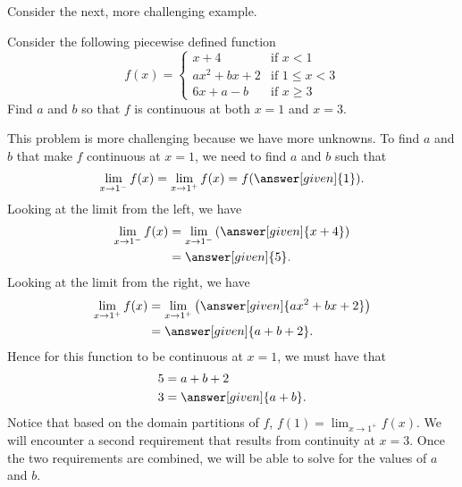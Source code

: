 \documentclass{ximera}
\begin{document}
Consider the next, more challenging example.

\begin{example}
Consider the following piecewise defined function
\[
f(x) = 
\begin{cases}
  x+4 &\text{if $x<1$}\\
  ax^2+bx+2 &\text{if $1\le x< 3$}\\
  6x+a-b &\text{if $x\ge 3$}
\end{cases}
\]
Find $a$ and $b$ so that $f$ is continuous at both $x=1$ and $x=3$.
\begin{explanation}
This problem is more challenging because we have more
unknowns. To find $a$ and
$b$ that make $f$ continuous at $x=1$, we need to find $a$ and $b$
such that
\[
\lim_{x\to 1^-} f(x) = \lim_{x\to 1^+}f(x)=f(\answer[given]{1}).
\]
Looking at the limit from the left, we have
\begin{align*}
  \lim_{x\to 1^-} f(x) &= \lim_{x\to 1^-} \left(\answer[given]{x+4}\right) \\
  &=\answer[given]{5}.
\end{align*}
Looking at the limit from the right, we have
\begin{align*}
  \lim_{x\to 1^+} f(x) &= \lim_{x\to 1^+} \left(\answer[given]{ax^2+bx+2}\right) \\
  &= \answer[given]{a+b+2}.
\end{align*}
Hence for this function to be continuous at $x=1$, we must have that
\begin{align*}
  5 &= a+b+2\\
  3 &= \answer[given]{a+b}.
\end{align*}
Notice that based on the domain partitions of $f$, $f(1)=\lim_{x\to 1^+} f(x)$. We will encounter a second requirement that results from continuity at $x=3$. Once the two requirements are combined, we will be able to solve for the values of $a$ and $b$.


\end{explanation}
\end{example}
\end{document}
